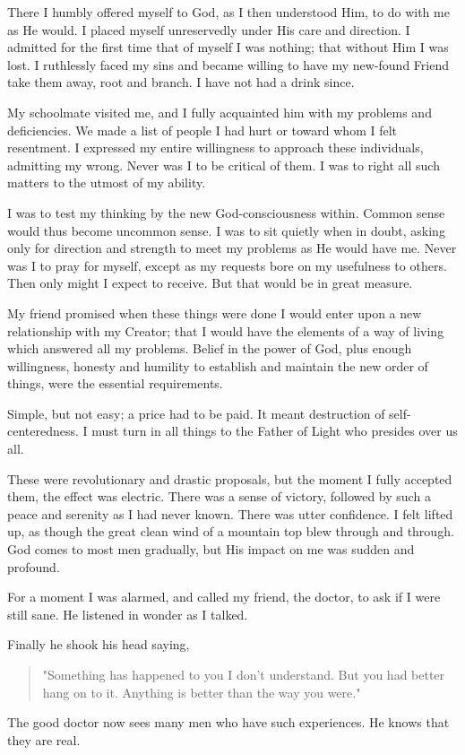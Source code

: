 \begin{biblechapter}
    There I humbly offered myself to God, 
    as I then understood Him, 
    to do with me as He would.
\verse I placed myself unreservedly under His care and direction.
\verse I admitted for the first time that of myself I was nothing; 
    that without Him I was lost.
\verse I ruthlessly faced my sins 
    and became willing to have my new-found Friend take them away, 
    root and branch.
\verse I have not had a drink since.

\verse My schoolmate visited me, 
    and I fully acquainted him with my problems and deficiencies.
\verse We made a list of people I had hurt 
    or toward whom I felt resentment.
\verse I expressed my entire willingness to approach these individuals, 
    admitting my wrong.
\verse Never was I to be critical of them.
\verse I was to right all such matters to the utmost of my ability.

\verse I was to test my thinking by the new God-consciousness within.
\verse Common sense would thus become uncommon sense.
\verse I was to sit quietly when in doubt, 
    asking only for direction and strength to meet my problems as He would have me.
\verse Never was I to pray for myself, 
    except as my requests bore on my usefulness to others.
\verse Then only might I expect to receive.
\verse But that would be in great measure.

\verse My friend promised when these things were done 
    I would enter upon a new relationship with my Creator; 
    that I would have the elements of a way of living 
    which answered all my problems.
\verse Belief in the power of God, 
    plus enough willingness, honesty and humility 
    to establish and maintain the new order of things, 
    were the essential requirements.

\verse Simple, but not easy; 
    a price had to be paid.
\verse It meant destruction of self-centeredness.
\verse I must turn in all things to the Father of Light 
    who presides over us all.

\verse These were revolutionary and drastic proposals, 
    but the moment I fully accepted them, 
    the effect was electric.
\verse There was a sense of victory, 
    followed by such a peace and serenity as I had never known.
\verse There was utter confidence.
\verse I felt lifted up, 
    as though the great clean wind of a mountain top blew through and through.
\verse God comes to most men gradually, 
    but His impact on me was sudden and profound.

\verse For a moment I was alarmed, and called my friend, the doctor, 
    to ask if I were still sane.
\verse He listened in wonder as I talked.

\verse Finally he shook his head saying,
    \begin{quote}
    "Something has happened to you I don't understand.
    But you had better hang on to it.
    Anything is better than the way you were."
    \end{quote}
\verse The good doctor now sees many men who have such experiences.
\verse He knows that they are real.
\end{biblechapter}


